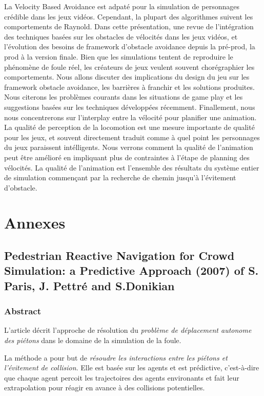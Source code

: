 \documentclass[11pt]{report}
\begin{document}
La Velocity Based Avoidance est adpaté pour la simulation de personnages crédible dans les jeux vidéos. Cependant, la plupart des algorithmes suivent les comportements de Raynold. 
Dans cette présentation, une revue de l'intégration des techniques basées sur les obstacles de vélocités dans les jeux vidéos, et l'évolution des besoins de framework d'obstacle avoidance depuis la pré-prod, la prod à la version finale.
Bien que les simulations tentent de reproduire le phénomène de foule réel, les créateurs de jeux veulent souvent chorégraphier les comportements. Nous allons discuter des implications du design du jeu sur les framework obstacle avoidance, les barrières à franchir et les solutions produites.
Nous citerons les problèmes courants dans les situations de game play et les suggestions basées sur les techniques développées récemment.
Finallement, nous nous concentrerons sur l'interplay entre la vélocité pour planifier une animation. La qualité de perception de la locomotion est une mesure importante de qualité pour les jeux, et souvent directement traduit comme à quel point les personnages du jeux paraissent intélligents. Nous verrons comment la qualité de l'animation peut être amélioré en impliquant plus de contraintes à l'étape de planning des vélocités. La qualité de l'animation est l'ensemble des résultats du système entier de simulation commençant par la recherche de chemin jusqu'à l'évitement d'obstacle. 


\section{Annexes}

\subsection{Pedestrian Reactive Navigation for Crowd Simulation: a Predictive Approach (2007) of S. Paris, J. Pettré and S.Donikian}

\subsubsection*{Abstract}

L'article décrit l'approche de résolution du \textit{problème de déplacement autonome des piétons} dans le domaine de la simulation de la foule. 

La méthode a pour but de \textit{résoudre les interactions entre les piétons et l'évitement de collision}. Elle est basée sur les agents et est prédictive, c'est-à-dire que chaque agent percoit les trajectoires des agents environants et fait leur extrapolation  pour réagir en avance à des collisions potentielles. 
\end{document}
